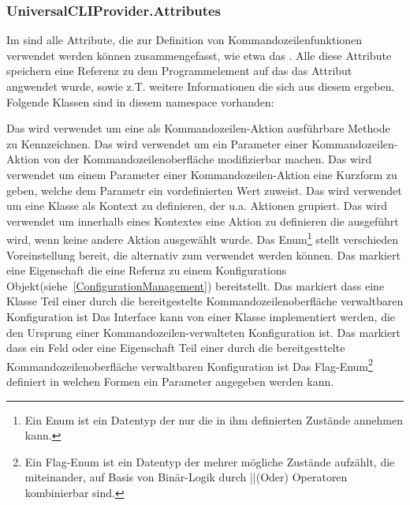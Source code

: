 \subsubsection{UniversalCLIProvider.Attributes}
Im  sind alle Attribute, die zur Definition von Kommandozeilenfunktionen verwendet werden können zusammengefasst, wie etwa das .
Alle diese Attribute speichern eine Referenz zu dem Programmelement auf das das Attribut angwendet wurde, sowie z.T. weitere Informationen die sich aus diesem ergeben.
Folgende Klassen sind in diesem namespace vorhanden:
\begin{outline}
 \1 Das  wird verwendet um eine als Kommandozeilen-Aktion ausführbare Methode zu Kennzeichnen.
 \1 Das  wird verwendet um ein Parameter einer Kommandozeilen-Aktion von der Kommandozeilenoberfläche modifizierbar machen.
 \1 Das  wird verwendet um einem Parameter einer Kommandozeilen-Aktion eine Kurzform zu geben, welche dem Parametr ein vordefinierten Wert zuweist.
 \1 Das  wird verwendet um eine Klasse als Kontext zu definieren, der u.a. Aktionen grupiert.
 \1 Das  wird verwendet um innerhalb eines Kontextes eine Aktion zu definieren die ausgeführt wird, wenn keine andere Aktion ausgewählt wurde.
 \1 Das Enum\footnote{Ein Enum ist ein Datentyp der nur die in ihm definierten Zustände annehmen kann.} 
 stellt verschieden Voreinstellung bereit, die alternativ zum  verwendet werden können.
 \1 Das  markiert eine Eigenschaft die eine Refernz zu einem Konfigurations Objekt(siehe~\ref{ConfigurationManagement}) bereitstellt.
 \1 Das  markiert dass eine Klasse Teil einer durch die bereitgestelte Kommandozeilenoberfläche verwaltbaren Konfiguration ist
 \1 Das Interface  kann von einer Klasse implementiert werden, die den Ursprung einer Kommandozeilen-verwalteten Konfiguration ist.
 \1 Das markiert dass ein Feld oder eine Eigenschaft Teil einer durch die bereitgesttelte Kommandozeilenoberfläche verwaltbaren Konfiguration ist
 \1 Das Flag-Enum\footnote{Ein Flag-Enum ist ein Datentyp der mehrer mögliche Zustände aufzählt, die miteinander, auf Basis von Binär-Logik durch ||(Oder) Operatoren kombinierbar sind.}
  definiert in welchen Formen ein Parameter angegeben werden kann.
\end{outline}
